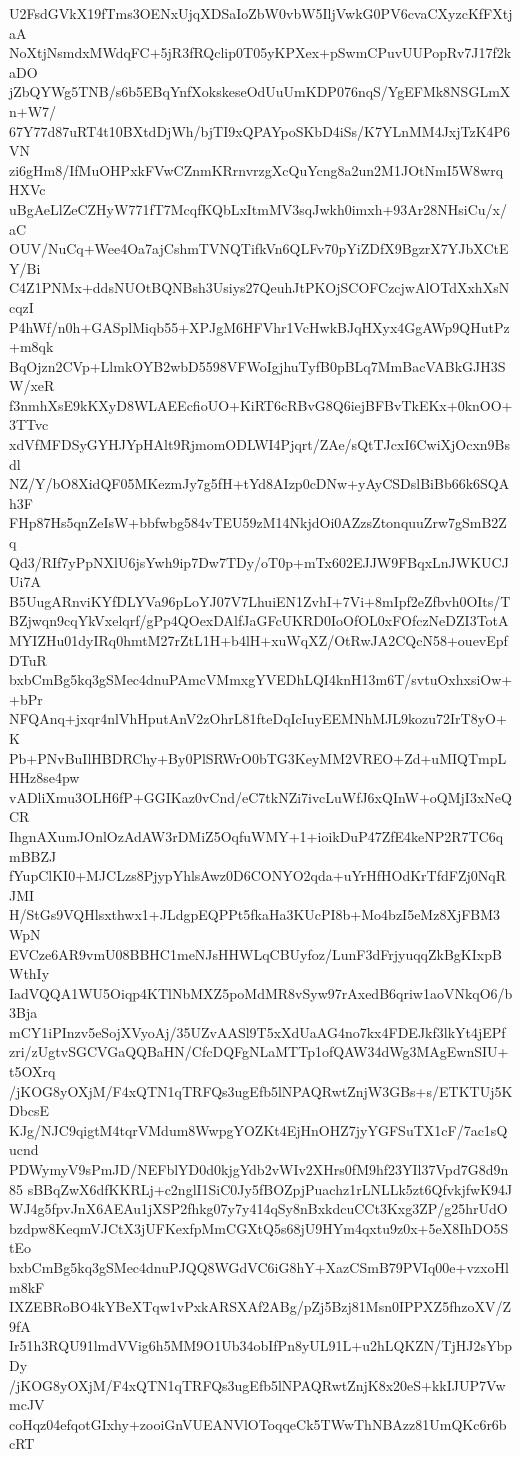 U2FsdGVkX19fTms3OENxUjqXDSaIoZbW0vbW5IljVwkG0PV6cvaCXyzcKfFXtjaA
NoXtjNsmdxMWdqFC+5jR3fRQclip0T05yKPXex+pSwmCPuvUUPopRv7J17f2kaDO
jZbQYWg5TNB/s6b5EBqYnfXokskeseOdUuUmKDP076nqS/YgEFMk8NSGLmXn+W7/
67Y77d87uRT4t10BXtdDjWh/bjTI9xQPAYpoSKbD4iSs/K7YLnMM4JxjTzK4P6VN
zi6gHm8/IfMuOHPxkFVwCZnmKRrnvrzgXcQuYcng8a2un2M1JOtNmI5W8wrqHXVc
uBgAeLlZeCZHyW771fT7McqfKQbLxItmMV3sqJwkh0imxh+93Ar28NHsiCu/x/aC
OUV/NuCq+Wee4Oa7ajCshmTVNQTifkVn6QLFv70pYiZDfX9BgzrX7YJbXCtEY/Bi
C4Z1PNMx+ddsNUOtBQNBsh3Usiys27QeuhJtPKOjSCOFCzcjwAlOTdXxhXsNcqzI
P4hWf/n0h+GASplMiqb55+XPJgM6HFVhr1VcHwkBJqHXyx4GgAWp9QHutPz+m8qk
BqOjzn2CVp+LlmkOYB2wbD5598VFWoIgjhuTyfB0pBLq7MmBacVABkGJH3SW/xeR
f3nmhXsE9kKXyD8WLAEEcfioUO+KiRT6cRBvG8Q6iejBFBvTkEKx+0knOO+3TTvc
xdVfMFDSyGYHJYpHAlt9RjmomODLWI4Pjqrt/ZAe/sQtTJcxI6CwiXjOcxn9Bsdl
NZ/Y/bO8XidQF05MKezmJy7g5fH+tYd8AIzp0cDNw+yAyCSDslBiBb66k6SQAh3F
FHp87Hs5qnZeIsW+bbfwbg584vTEU59zM14NkjdOi0AZzsZtonquuZrw7gSmB2Zq
Qd3/RIf7yPpNXlU6jsYwh9ip7Dw7TDy/oT0p+mTx602EJJW9FBqxLnJWKUCJUi7A
B5UugARnviKYfDLYVa96pLoYJ07V7LhuiEN1ZvhI+7Vi+8mIpf2eZfbvh0OIts/T
BZjwqn9cqYkVxelqrf/gPp4QOexDAlfJaGFcUKRD0IoOfOL0xFOfczNeDZI3TotA
MYIZHu01dyIRq0hmtM27rZtL1H+b4lH+xuWqXZ/OtRwJA2CQcN58+ouevEpfDTuR
bxbCmBg5kq3gSMec4dnuPAmcVMmxgYVEDhLQI4knH13m6T/svtuOxhxsiOw++bPr
NFQAnq+jxqr4nlVhHputAnV2zOhrL81fteDqIcIuyEEMNhMJL9kozu72IrT8yO+K
Pb+PNvBuIlHBDRChy+By0PlSRWrO0bTG3KeyMM2VREO+Zd+uMIQTmpLHHz8se4pw
vADliXmu3OLH6fP+GGIKaz0vCnd/eC7tkNZi7ivcLuWfJ6xQInW+oQMjI3xNeQCR
IhgnAXumJOnlOzAdAW3rDMiZ5OqfuWMY+1+ioikDuP47ZfE4keNP2R7TC6qmBBZJ
fYupClKI0+MJCLzs8PjypYhlsAwz0D6CONYO2qda+uYrHfHOdKrTfdFZj0NqRJMI
H/StGs9VQHlsxthwx1+JLdgpEQPPt5fkaHa3KUcPI8b+Mo4bzI5eMz8XjFBM3WpN
EVCze6AR9vmU08BBHC1meNJsHHWLqCBUyfoz/LunF3dFrjyuqqZkBgKIxpBWthIy
IadVQQA1WU5Oiqp4KTlNbMXZ5poMdMR8vSyw97rAxedB6qriw1aoVNkqO6/b3Bja
mCY1iPInzv5eSojXVyoAj/35UZvAASl9T5xXdUaAG4no7kx4FDEJkf3lkYt4jEPf
zri/zUgtvSGCVGaQQBaHN/CfcDQFgNLaMTTp1ofQAW34dWg3MAgEwnSIU+t5OXrq
/jKOG8yOXjM/F4xQTN1qTRFQs3ugEfb5lNPAQRwtZnjW3GBs+s/ETKTUj5KDbcsE
KJg/NJC9qigtM4tqrVMdum8WwpgYOZKt4EjHnOHZ7jyYGFSuTX1cF/7ac1sQucnd
PDWymyV9sPmJD/NEFblYD0d0kjgYdb2vWIv2XHrs0fM9hf23YIl37Vpd7G8d9n85
sBBqZwX6dfKKRLj+c2nglI1SiC0Jy5fBOZpjPuachz1rLNLLk5zt6QfvkjfwK94J
WJ4g5fpvJnX6AEAu1jXSP2fhkg07y7y414qSy8nBxkdcuCCt3Kxg3ZP/g25hrUdO
bzdpw8KeqmVJCtX3jUFKexfpMmCGXtQ5s68jU9HYm4qxtu9z0x+5eX8IhDO5StEo
bxbCmBg5kq3gSMec4dnuPJQQ8WGdVC6iG8hY+XazCSmB79PVIq00e+vzxoHlm8kF
IXZEBRoBO4kYBeXTqw1vPxkARSXAf2ABg/pZj5Bzj81Msn0IPPXZ5fhzoXV/Z9fA
Ir51h3RQU91lmdVVig6h5MM9O1Ub34obIfPn8yUL91L+u2hLQKZN/TjHJ2sYbpDy
/jKOG8yOXjM/F4xQTN1qTRFQs3ugEfb5lNPAQRwtZnjK8x20eS+kkIJUP7VwmcJV
coHqz04efqotGIxhy+zooiGnVUEANVlOToqqeCk5TWwThNBAzz81UmQKc6r6bcRT
